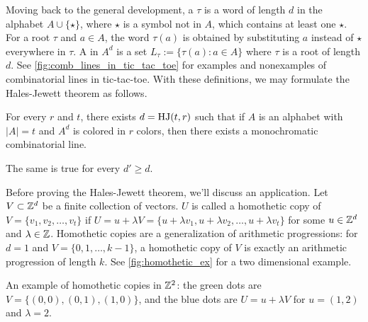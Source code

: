 Moving back to the general development, a  $\tau$ is a word of length $d$ in the alphabet $A\cup \{\star\}$, where $\star$ is a symbol not in $A$, which contains at least one $\star$.
For a root $\tau$ and $a\in A$, the word $\tau(a)$ is obtained by substituting $a$ instead of $\star$ everywhere in $\tau$. A  in $A^d$ is a set $L_\tau:=\{ \tau(a): a\in A\}$ where $\tau$ is a root of length $d$. See \cref{fig:comb_lines_in_tic_tac_toe} for examples and nonexamples of combinatorial lines in tic-tac-toe. With these definitions, we may formulate the Hales-Jewett theorem as follows. 
\begin{theorem} \label{thm:HJ}
For every $r$ and $t$, there exists $d= \operatorname{HJ}(t,r)$ such that if $A$ is an alphabet with $|A|=t$ and $A^d$ is colored in $r$ colors, then there exists a monochromatic combinatorial line. 
\end{theorem}
\begin{remark}
The same is true for every $d' \geq d$.
\end{remark}
Before proving the Hales-Jewett theorem, we'll discuss an application. 
Let $V\subset \mathbb{Z}^d$ be a finite collection of vectors. $U$ is called a homothetic copy of $V=\{v_1,v_2,\dotsc,v_t\}$ if $U = u +\lambda V = \{ u + \lambda v_1,u+\lambda v_2,\dotsc, u+\lambda v_t\}$ for some $u\in \mathbb{Z}^d$ and $\lambda\in \mathbb{Z}$. Homothetic copies are a generalization of arithmetic progressions: for $d=1$ and $V = \{0,1,\dotsc,k-1\}$, a homothetic copy of $V$ is exactly an arithmetic progression of length $k$. See  \cref{fig:homothetic_ex} for a two dimensional example.
\begin{marginfigure}[2cm]
\begin{center}
\end{center}
\caption{An example of homothetic copies in $\mathbb{Z}^2$: the green dots are $V = \{(0,0),(0,1),(1,0)\}$, and the blue dots are $U= u +\lambda V$ for $u = (1,2)$ and $\lambda=2$.} \label{fig:homothetic_ex}
\end{marginfigure}
